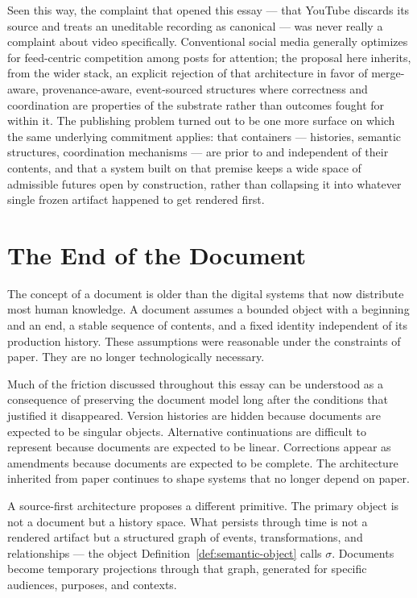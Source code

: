 \documentclass[11pt]{article}
\theoremstyle{definition}
\begin{document}
Seen this way, the complaint that opened this essay --- that YouTube discards its source and treats an uneditable recording as canonical --- was never really a complaint about video specifically. Conventional social media generally optimizes for feed-centric competition among posts for attention; the proposal here inherits, from the wider stack, an explicit rejection of that architecture in favor of merge-aware, provenance-aware, event-sourced structures where correctness and coordination are properties of the substrate rather than outcomes fought for within it. The publishing problem turned out to be one more surface on which the same underlying commitment applies: that containers --- histories, semantic structures, coordination mechanisms --- are prior to and independent of their contents, and that a system built on that premise keeps a wide space of admissible futures open by construction, rather than collapsing it into whatever single frozen artifact happened to get rendered first.

\section{The End of the Document}
\label{sec:end-of-document}

The concept of a document is older than the digital systems that now distribute most human knowledge. A document assumes a bounded object with a beginning and an end, a stable sequence of contents, and a fixed identity independent of its production history. These assumptions were reasonable under the constraints of paper. They are no longer technologically necessary.

Much of the friction discussed throughout this essay can be understood as a consequence of preserving the document model long after the conditions that justified it disappeared. Version histories are hidden because documents are expected to be singular objects. Alternative continuations are difficult to represent because documents are expected to be linear. Corrections appear as amendments because documents are expected to be complete. The architecture inherited from paper continues to shape systems that no longer depend on paper.

A source-first architecture proposes a different primitive. The primary object is not a document but a history space. What persists through time is not a rendered artifact but a structured graph of events, transformations, and relationships --- the object Definition~\ref{def:semantic-object} calls $\sigma$. Documents become temporary projections through that graph, generated for specific audiences, purposes, and contexts.
\end{document}
